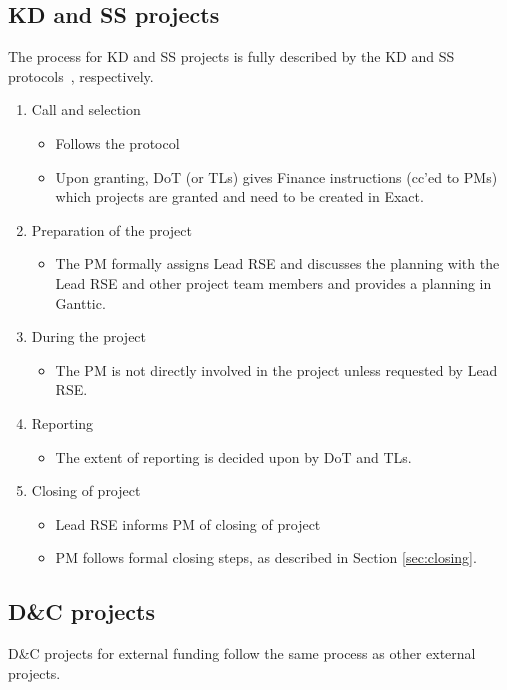 \subsection{KD and SS projects}
The process for KD and SS projects is fully described by the KD and SS protocols~\cite{intranet}, respectively.
\begin{enumerate}[label=\arabic*.,ref=\arabic*]
\item Call and selection
\begin{itemize}
\item Follows the protocol
\item Upon granting, DoT (or TLs) gives Finance instructions (cc'ed to PMs) which
projects are granted and need to be created in Exact.
\end{itemize}
\item Preparation of the project
\begin{itemize}
\item The PM formally assigns Lead RSE and discusses the planning with the Lead RSE and other
project team members and provides a planning in Ganttic.
\end{itemize}
\item During the project
\begin{itemize}
\item The PM is not directly involved in the project unless requested by Lead RSE.
\end{itemize}
\item Reporting
\begin{itemize}
\item The extent of reporting is decided upon by DoT and TLs.
\end{itemize}
\item Closing of project
\begin{itemize}
\item Lead RSE informs PM of closing of project
\item PM follows formal closing steps, as described in Section \ref{sec:closing}.
\end{itemize}
\end{enumerate}

\subsection{D\&C projects}
D\&C projects for external funding follow the same process as other external projects.

